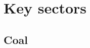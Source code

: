 \documentclass[12pt,english]{article}
\begin{document}
\clearpage
\section{Key sectors}
%
%
%

\subsection{Coal}

\citep{coal2013DoE}
\citep{holz2018peakcoal}
\end{document}
